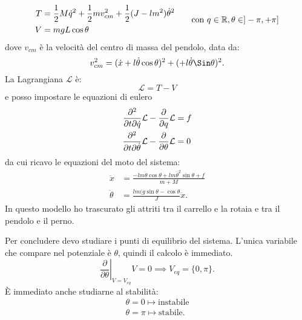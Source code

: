 \begin{equation*}
    \begin{aligned}
        T &= \frac 1 2 M  \dot q^2 + \frac 1 2 m v_{cm}^2 + \frac 1 2 (J - lm^2)\dot \theta^2 \\ %
        V &= mgL \cos\theta
    \end{aligned}
    \hspace{20pt} \text{con } q \in \R, \theta \in ]-\pi, +\pi]
    \label{eq:energy}
\end{equation*}
dove $v_{cm}$ è la velocità del centro di massa del pendolo, data da:
\begin{equation*}
    v^2_{cm} = (\dot x + l \dot \theta \cos \theta)^2 + (+ l \dot \theta \Sin \theta)^2.
\end{equation*}
La Lagrangiana $\mathcal L$ è:
\begin{equation*}
    \mathcal L = T - V
\end{equation*}
e posso impostare le equazioni di eulero
\begin{equation*}
    \begin{aligned}
        \frac{\partial^2}{\partial t \partial \dot q} \mathcal L - \frac \partial {\partial q} \mathcal L &= f \\
        \frac{\partial^2}{\partial t \partial \dot \theta} \mathcal L  - \frac \partial {\partial \theta} \mathcal L &= 0
    \end{aligned}
    \label{eq:eulero}
\end{equation*}
da cui ricavo le equazioni del moto del sistema:
\begin{equation}
    \begin{aligned}
        \ddot x &= \frac {-lm \ddot \theta \cos \theta + lm \dot \theta^2 \sin \theta + f} {m + M} \\
        \ddot \theta &= \frac {lm (g\sin \theta - \cos \theta }{J} \ddot x.
    \end{aligned}
    \label{eq:moto-sistema}
\end{equation}
In questo modello ho trascurato gli attriti tra il carrello e la rotaia e tra
il pendolo e il perno.

Per concludere devo studiare i punti di equilibrio del sistema.
L'unica variabile che compare nel potenziale è $\theta$, quindi il calcolo è
immediato.
\begin{equation*}
    \left. \frac \partial {\partial \theta}\right |_{V=V_{eq}} V =  0 \implies V_{eq} = \{0, \pi\}.
\end{equation*}
È immediato anche studiarne al stabilità:
\begin{align*}
    \theta = 0 \mapsto \text{instabile} \\
    \theta = \pi \mapsto \text{stabile}.
\end{align*}

